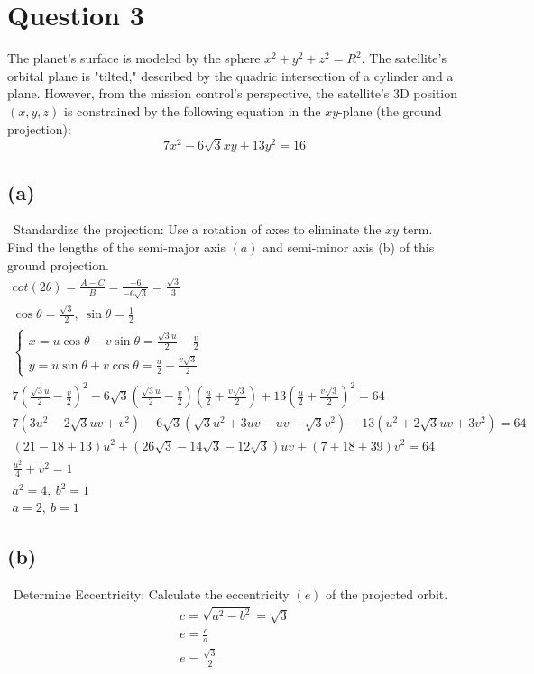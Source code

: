 \documentclass[12pt]{article}
\begin{document}
\section{Question 3}
The planet's surface is modeled by the sphere $x^2+y^2+z^2=R^2$. The satellite's orbital plane is "tilted," described by the quadric intersection of a cylinder and a plane. However, from the mission control's perspective, the satellite's 3D position $(x,y,z)$ is constrained by the following equation in the $xy$-plane (the ground projection):
\[
7x^2-6\sqrt{3}xy+13y^2=16
\]

\subsection{(a)} \, Standardize the projection: Use a rotation of axes to eliminate the $xy$ term. Find the lengths of the semi-major axis $(a)$ and semi-minor axis (b) of this ground projection.
\begin{gather*}
    cot(2\theta)=\frac{A-C}{B}=\frac{-6}{-6\sqrt{3}}=\frac{\sqrt{3}}{3}\\
    \cos\theta=\frac{\sqrt{3}}{2}, \ \sin{\theta}=\frac{1}{2}\\
    \begin{cases}
        x=u\cos\theta -v\sin\theta = \frac{\sqrt{3}u}{2}-\frac{v}{2}\\
        y=u\sin\theta + v\cos\theta = \frac{u}{2}+\frac{v\sqrt{3}}{2}
    \end{cases}\\
    7(\frac{\sqrt{3}u}{2}-\frac{v}{2})^2-6\sqrt{3}(\frac{\sqrt{3}u}{2}-\frac{v}{2})(\frac{u}{2}+\frac{v\sqrt{3}}{2})+13(\frac{u}{2}+\frac{v\sqrt{3}}{2})^2=64\\
    7(3u^2-2\sqrt{3}uv+v^2)-6\sqrt{3}(\sqrt{3}u^2+3uv-uv-\sqrt{3}v^2)+13(u^2+2\sqrt{3}uv+3v^2)=64\\
    (21-18+13)u^2+(26\sqrt{3}-14\sqrt{3}-12\sqrt{3})uv+(7+18+39)v^2=64\\
    \frac{u^2}{4}+v^2=1\\
    a^2=4,\ b^2=1\\
    \boxed{a=2,\ b=1}
\end{gather*}

\subsection{(b)} \, Determine Eccentricity: Calculate the eccentricity $(e)$ of the projected orbit.
\begin{gather*}
    c=\sqrt{a^2-b^2}=\sqrt{3}\\
    e=\frac{c}{a}\\
    \boxed{e=\frac{\sqrt{3}}{2}}
\end{gather*}
\end{document}

